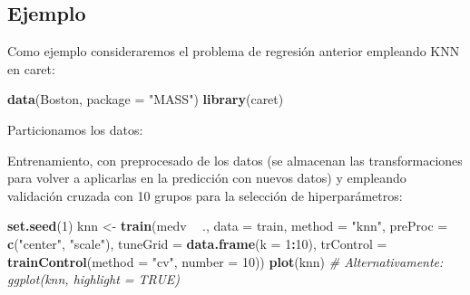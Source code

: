 \documentclass[
  spanish,
]{book}
\newenvironment{Shaded}{\begin{snugshade}}{\end{snugshade}}
\newcommand{\CommentTok}[1]{\textcolor[rgb]{0.56,0.35,0.01}{\textit{#1}}}
\newcommand{\DataTypeTok}[1]{\textcolor[rgb]{0.13,0.29,0.53}{#1}}
\newcommand{\DecValTok}[1]{\textcolor[rgb]{0.00,0.00,0.81}{#1}}
\newcommand{\FloatTok}[1]{\textcolor[rgb]{0.00,0.00,0.81}{#1}}
\newcommand{\KeywordTok}[1]{\textcolor[rgb]{0.13,0.29,0.53}{\textbf{#1}}}
\newcommand{\NormalTok}[1]{#1}
\newcommand{\OperatorTok}[1]{\textcolor[rgb]{0.81,0.36,0.00}{\textbf{#1}}}
\newcommand{\OtherTok}[1]{\textcolor[rgb]{0.56,0.35,0.01}{#1}}
\newcommand{\StringTok}[1]{\textcolor[rgb]{0.31,0.60,0.02}{#1}}
\theoremstyle{break}
\theoremstyle{definition}
\theoremstyle{definition}
\theoremstyle{definition}
\theoremstyle{remark}
\begin{document}
\hypertarget{ejemplo}{%
\subsection{Ejemplo}\label{ejemplo}}

Como ejemplo consideraremos el problema de regresión anterior empleando KNN en caret:

\begin{Shaded}
\begin{Highlighting}[]
\KeywordTok{data}\NormalTok{(Boston, }\DataTypeTok{package =} \StringTok{"MASS"}\NormalTok{)}
\KeywordTok{library}\NormalTok{(caret)}
\end{Highlighting}
\end{Shaded}

Particionamos los datos:

\begin{Shaded}
\end{Shaded}

Entrenamiento, con preprocesado de los datos (se almacenan las transformaciones para volver a aplicarlas en la predicción con nuevos datos) y empleando validación cruzada con 10 grupos para la selección de hiperparámetros:

\begin{Shaded}
\begin{Highlighting}[]
\KeywordTok{set.seed}\NormalTok{(}\DecValTok{1}\NormalTok{)}
\NormalTok{knn <-}\StringTok{ }\KeywordTok{train}\NormalTok{(medv }\OperatorTok{~}\StringTok{ }\NormalTok{., }\DataTypeTok{data =}\NormalTok{ train,}
             \DataTypeTok{method =} \StringTok{"knn"}\NormalTok{,}
             \DataTypeTok{preProc =} \KeywordTok{c}\NormalTok{(}\StringTok{"center"}\NormalTok{, }\StringTok{"scale"}\NormalTok{),}
             \DataTypeTok{tuneGrid =} \KeywordTok{data.frame}\NormalTok{(}\DataTypeTok{k =} \DecValTok{1}\OperatorTok{:}\DecValTok{10}\NormalTok{),}
             \DataTypeTok{trControl =} \KeywordTok{trainControl}\NormalTok{(}\DataTypeTok{method =} \StringTok{"cv"}\NormalTok{, }\DataTypeTok{number =} \DecValTok{10}\NormalTok{))}
\KeywordTok{plot}\NormalTok{(knn) }\CommentTok{# Alternativamente: ggplot(knn, highlight = TRUE)}
\end{Highlighting}
\end{Shaded}
\end{document}
